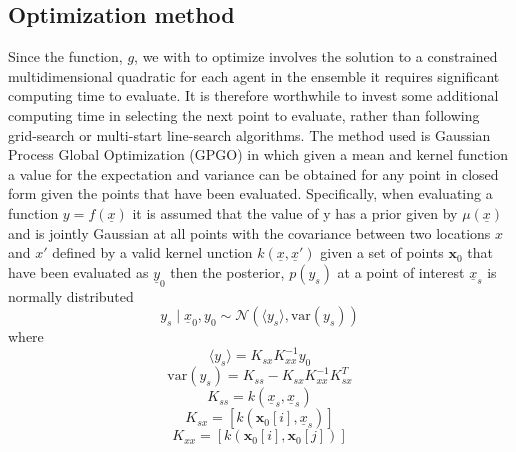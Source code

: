 \documentclass[a4paper, 10 pt, conference]{ieeeconf}  %
\begin{document}
\subsection{Optimization method}
Since the function, $g$, we with to optimize involves the solution to a constrained multidimensional quadratic for each agent in the ensemble it requires significant computing time to evaluate. It is therefore worthwhile to invest some additional computing time in selecting the next point to evaluate, rather than following grid-search or multi-start line-search algorithms. The method used is Gaussian Process Global Optimization (GPGO)\cite{garnettgaussian} in which given a mean and kernel function a value for the expectation and variance can be obtained for any point in closed form given the points that have been evaluated.
Specifically, when evaluating a function $y=f(\underline{x})$  it is assumed that the value of y has a prior given by $\mu (\underline{x})$ and is jointly Gaussian at all points with the covariance between two locations $x$ and $x'$ defined by a valid kernel unction $k(\underline{x},\underline{x}')$ given a set of points $\mathbf{x}_{0}$ that have been evaluated as $\underline{y}_{0}$ then the posterior, $p(y_{s})$ at a point of interest $\underline{x}_s$ is normally distributed
\begin{equation}
 y_{s}\mid \underline{x}_{0},y_{0}\sim\mathcal{N}\left( \langle y_{s}\rangle ,\mathrm{var}(y_{s})\right)
\end{equation}
where
\begin{equation}
\langle y_{s}\rangle 	=K_{sx}K_{xx}^{-1}y_{0}
\end{equation}
\begin{equation}
\mathrm{var}\left(y_{s}\right)	=K_{ss}-K_{sx} K_{xx}^{-1} K_{sx}^{T}
\end{equation}
\begin{equation}
K_{ss}	= k(\underline{x}_s,\underline{x}_s)
\end{equation}
\begin{equation}
K_{sx}	=[k\left(\mathbf{x}_{0}[i],\underline{x}_s\right)]
\end{equation}
\begin{equation}
K_{xx}	=[k\left(\mathbf{x}_{0}[i],\mathbf{x}_{0}[j]\right)]
\end{equation}
\end{document}
